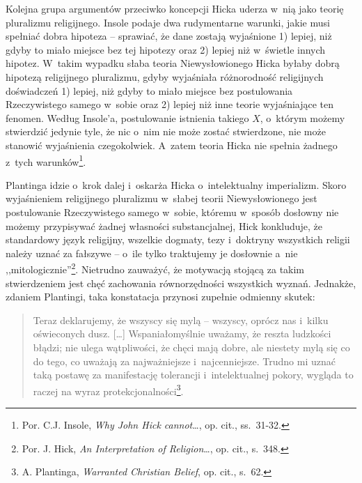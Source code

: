 Kolejna grupa argumentów przeciwko koncepcji Hicka uderza w~nią jako teorię pluralizmu religijnego. Insole podaje dwa rudymentarne warunki, jakie musi spełniać dobra hipoteza -- sprawiać, że dane zostają wyjaśnione 1) lepiej, niż gdyby to miało miejsce bez tej hipotezy oraz 2) lepiej niż w~świetle innych hipotez. W~takim wypadku słaba teoria Niewysłowionego Hicka byłaby dobrą hipotezą religijnego pluralizmu, gdyby wyjaśniała różnorodność religijnych doświadczeń 1) lepiej, niż gdyby to miało miejsce bez postulowania Rzeczywistego samego w~sobie oraz 2) lepiej niż inne teorie wyjaśniające ten fenomen. Według Insole'a, postulowanie istnienia takiego $X$, o~którym możemy stwierdzić jedynie tyle, że nic o~nim nie może zostać stwierdzone, nie może stanowić wyjaśnienia czegokolwiek. A~zatem teoria Hicka nie spełnia żadnego z~tych warunków\footnote{Por. C.J. Insole, \textit{Why John Hick cannot}\ldots, op. cit., ss.~31-32.}.

Plantinga idzie o~krok dalej i~oskarża Hicka o~intelektualny imperializm. Skoro wyjaśnieniem religijnego pluralizmu w~słabej teorii Niewysłowionego jest postulowanie Rzeczywistego samego w~sobie, któremu w~sposób dosłowny nie możemy przypisywać żadnej własności substancjalnej, Hick konkluduje, że standardowy język religijny, wszelkie dogmaty, tezy i~doktryny wszystkich religii należy uznać za fałszywe -- o~ile tylko traktujemy je dosłownie a~nie ,,mitologicznie''\footnote{Por. J. Hick, \textit{An Interpretation of Religion}\ldots, op. cit., s.~348.}. Nietrudno zauważyć, że motywacją stojącą za takim stwierdzeniem jest chęć zachowania równorzędności wszystkich wyznań. Jednakże, zdaniem Plantingi, taka konstatacja przynosi zupełnie odmienny skutek:

\begin{quote}
Teraz deklarujemy, że wszyscy się mylą -- wszyscy, oprócz nas i~kilku oświeconych dusz. [\ldots] Wspaniałomyślnie uważamy, że reszta ludzkości błądzi; nie ulega wątpliwości, że chęci mają dobre, ale niestety mylą się co do tego, co uważają za najważniejsze i~najcenniejsze. Trudno mi uznać taką postawę za manifestację tolerancji i~intelektualnej pokory, wygląda to raczej na wyraz protekcjonalności\footnote{A. Plantinga, \textit{Warranted Christian Belief}, op. cit., s.~62.}.
\end{quote}

